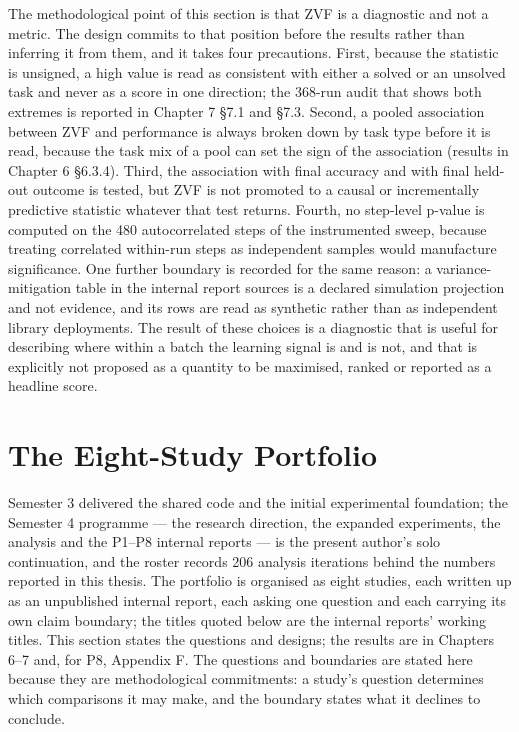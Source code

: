 \documentclass[12pt,a4paper]{report}
\begin{document}
The methodological point of this section is that ZVF is a diagnostic and
not a metric. The design commits to that position before the results
rather than inferring it from them, and it takes four precautions.
First, because the statistic is unsigned, a high value is read as
consistent with either a solved or an unsolved task and never as a score
in one direction; the 368-run audit that shows both extremes is reported
in Chapter 7 §7.1 and §7.3. Second, a pooled association between ZVF and
performance is always broken down by task type before it is read,
because the task mix of a pool can set the sign of the association
(results in Chapter 6 §6.3.4). Third, the association with final
accuracy and with final held-out outcome is tested, but ZVF is not
promoted to a causal or incrementally predictive statistic whatever that
test returns. Fourth, no step-level p-value is computed on the 480
autocorrelated steps of the instrumented sweep, because treating
correlated within-run steps as independent samples would manufacture
significance. One further boundary is recorded for the same reason: a
variance-mitigation table in the internal report sources is a declared
simulation projection and not evidence, and its rows are read as
synthetic rather than as independent library deployments. The result of
these choices is a diagnostic that is useful for describing where within
a batch the learning signal is and is not, and that is explicitly not
proposed as a quantity to be maximised, ranked or reported as a headline
score.

\section{The Eight-Study Portfolio}\label{the-eight-study-portfolio}

Semester 3 delivered the shared code and the initial experimental
foundation; the Semester 4 programme --- the research direction, the
expanded experiments, the analysis and the P1--P8 internal reports ---
is the present author's solo continuation, and the roster records 206
analysis iterations behind the numbers reported in this thesis. The
portfolio is organised as eight studies, each written up as an
unpublished internal report, each asking one question and each carrying
its own claim boundary; the titles quoted below are the internal
reports' working titles. This section states the questions and designs;
the results are in Chapters 6--7 and, for P8, Appendix F. The questions
and boundaries are stated here because they are methodological
commitments: a study's question determines which comparisons it may
make, and the boundary states what it declines to conclude.
\end{document}
